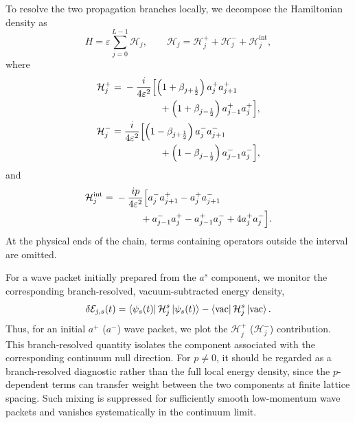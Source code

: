 \documentclass[reprint,amsmath,amssymb,aps,prb,floatfix,showkeys,superscriptaddress]{revtex4-2}
\begin{document}
To resolve the two propagation branches locally, we decompose the
Hamiltonian density as
\begin{equation}
  H
  =
  \varepsilon\sum_{j=0}^{L-1}\mathcal{H}_j,
  \qquad
  \mathcal{H}_j
  =
  \mathcal{H}_j^+
  +
  \mathcal{H}_j^-
  +
  \mathcal{H}_j^{\mathrm{int}},
  \label{eq:local_Hamiltonian_decomposition}
\end{equation}
where
\begin{align}
  \mathcal{H}_j^+
  ={}&
  -\frac{i}{4\varepsilon^2}
  \Bigl[
    \left(
      1+\beta_{j+\frac12}
    \right)
    a_j^+a_{j+1}^+
  \nonumber\\
  &\hspace{13mm}
    +
    \left(
      1+\beta_{j-\frac12}
    \right)
    a_{j-1}^+a_j^+
  \Bigr],
  \label{eq:H_density_plus}
  \\
  \mathcal{H}_j^-
  ={}&
  \frac{i}{4\varepsilon^2}
  \Bigl[
    \left(
      1-\beta_{j+\frac12}
    \right)
    a_j^-a_{j+1}^-
  \nonumber\\
  &\hspace{13mm}
    +
    \left(
      1-\beta_{j-\frac12}
    \right)
    a_{j-1}^-a_j^-
  \Bigr],
  \label{eq:H_density_minus}
\end{align}
and
\begin{align}
  \mathcal{H}_j^{\mathrm{int}}
  ={}&
  -\frac{i p}{4\varepsilon^2}
  \Bigl[
    a_j^-a_{j+1}^+
    -
    a_j^+a_{j+1}^-
  \nonumber\\
  &\hspace{9mm}
    +
    a_{j-1}^-a_j^+
    -
    a_{j-1}^+a_j^-
    +
    4a_j^+a_j^-
  \Bigr].
  \label{eq:H_density_interaction}
\end{align}
At the physical ends of the chain, terms containing operators outside
the interval are omitted.

For a wave packet initially prepared from the $a^s$ component, we
monitor the corresponding branch-resolved, vacuum-subtracted energy
density,
\begin{equation}
  \delta\mathcal{E}_{j,s}(t)
  =
  \bra{\psi_s(t)}
  \mathcal{H}_j^s
  \ket{\psi_s(t)}
  -
  \bra{\mathrm{vac}}
  \mathcal{H}_j^s
  \ket{\mathrm{vac}}.
  \label{eq:branch_resolved_energy}
\end{equation}
Thus, for an initial $a^+$ ($a^-$) wave packet, we plot the
$\mathcal{H}_j^+$ ($\mathcal{H}_j^-$) contribution. This
branch-resolved quantity isolates the component associated with the
corresponding continuum null direction. For $p\neq0$, it should be regarded as a branch-resolved
diagnostic rather than the full local energy density, since the
$p$-dependent terms can transfer weight between the two components
at finite lattice spacing. Such mixing is suppressed for sufficiently
smooth low-momentum wave packets and vanishes systematically in the
continuum limit.
\end{document}

